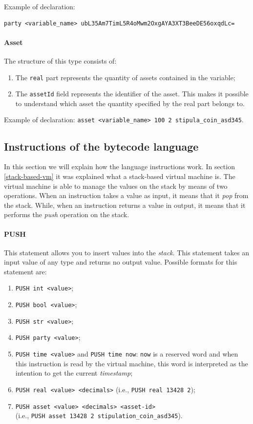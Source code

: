 Example of declaration: 
\begin{Verbatim}[xleftmargin=1cm,breaklines=true,breakanywhere=true,tabsize=2]
  party <variable_name> ubL35Am7TimL5R4oMwm2OxgAYA3XT3BeeDE56oxqdLc=
\end{Verbatim}

\paragraph{Asset}

The structure of this type consists of:
\begin{enumerate}
   \item The \verb|real| part represents the quantity of assets contained in the variable;
   \item The \verb|assetId| field represents the identifier of the asset. This makes it possible to 
   understand which asset the quantity specified by the real part belongs to.
\end{enumerate}

Example of declaration: \verb|asset <variable_name> 100 2 stipula_coin_asd345|.

\subsection{Instructions of the bytecode language}

In this section we will explain how the language instructions work. In section \ref{stack-based-vm} it 
was explained what a stack-based virtual machine is. The virtual machine is able to manage the values 
on the stack by means of two operations. When an instruction takes a value as input, it means that it 
\textit{pop} from the stack. While, when an instruction returns a value in output, it means that it 
performs the \textit{push} operation on the stack.

\paragraph{PUSH}

This statement allows you to insert values into the \textit{stack}. This statement takes an input value 
of any type and returns no output value. Possible formats for this statement are:
\begin{enumerate}
  \item \verb|PUSH int <value>|;
  \item \verb|PUSH bool <value>|;
  \item \verb|PUSH str <value>|;
  \item \verb|PUSH party <value>|;
  \item \verb|PUSH time <value>| and \verb|PUSH time now|: \verb|now| is a reserved word and 
  when this instruction is read by the virtual machine, this word is interpreted as the 
  intention to get the current \textit{timestamp};
  \item \verb|PUSH real <value> <decimals>| (i.e., \verb|PUSH real 13428 2|);
  \item \verb|PUSH asset <value> <decimals> <asset-id>|\\ 
  (i.e., \verb|PUSH asset 13428 2 stipulation_coin_asd345|).
\end{enumerate}

